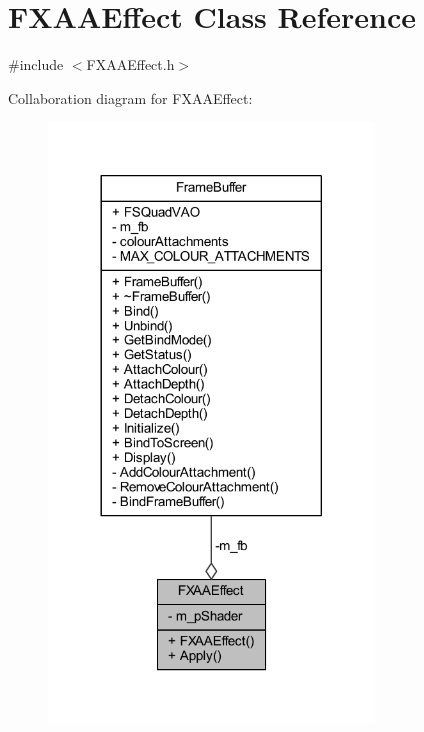 \hypertarget{class_f_x_a_a_effect}{}\section{F\+X\+A\+A\+Effect Class Reference}
\label{class_f_x_a_a_effect}


{\ttfamily \#include $<$F\+X\+A\+A\+Effect.\+h$>$}



Collaboration diagram for F\+X\+A\+A\+Effect\+:\nopagebreak
\begin{figure}[H]
\begin{center}
\leavevmode
\includegraphics[width=245pt]{class_f_x_a_a_effect__coll__graph}
\end{center}
\end{figure}
